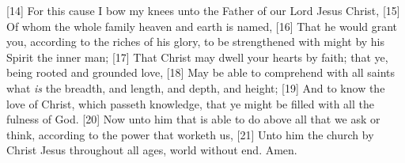 [14] \textcolor[cmyk]{0.99998,1,0,0}{For this cause I bow my knees unto the Father of our Lord Jesus Christ,}
[15] \textcolor[cmyk]{0.99998,1,0,0}{Of whom the whole family  heaven and earth is named,}
[16] \textcolor[cmyk]{0.99998,1,0,0}{That he would grant you, according to the riches of his glory, to be strengthened with might by his Spirit  the inner man;}
[17] \textcolor[cmyk]{0.99998,1,0,0}{That Christ may dwell  your hearts by faith; that ye, being rooted and grounded  love,}
[18] \textcolor[cmyk]{0.99998,1,0,0}{May be able to comprehend with all saints what \emph{is} the breadth, and length, and depth, and height;}
[19] \textcolor[cmyk]{0.99998,1,0,0}{And to know the love of Christ, which passeth knowledge, that ye might be filled with all the fulness of God.}
[20] \textcolor[cmyk]{0.99998,1,0,0}{Now unto him that is able to do  above all that we ask or think, according to the power that worketh  us,}
[21] \textcolor[cmyk]{0.99998,1,0,0}{Unto him   the church by Christ Jesus throughout all ages, world without end. Amen.}